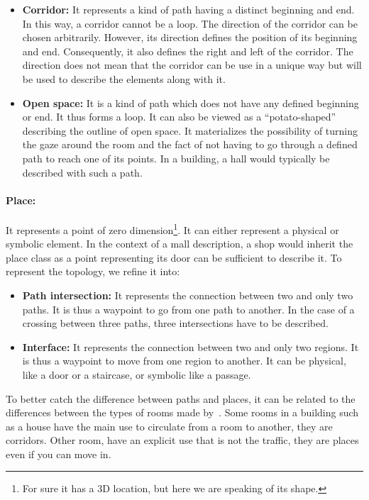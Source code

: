 \begin{itemize}
  \item \textbf{Corridor:} It represents a kind of path having a distinct beginning and end. In this way, a corridor cannot be a loop. The direction of the corridor can be chosen arbitrarily. However, its direction defines the position of its beginning and end. Consequently, it also defines the right and left of the corridor. The direction does not mean that the corridor can be use in a unique way but will be used to describe the elements along with it.
  \item \textbf{Open space:} It is a kind of path which does not have any defined beginning or end. It thus forms a loop. It can also be viewed as a ``potato-shaped'' describing the outline of open space. It materializes the possibility of turning the gaze around the room and the fact of not having to go through a defined path to reach one of its points. In a building, a hall would typically be described with such a path.
\end{itemize}

\paragraph{Place:} It represents a point of zero dimension\footnote{For sure it has a 3D location, but here we are speaking of its shape.}. It can either represent a physical or symbolic element. In the context of a mall description, a shop would inherit the place class as a point representing its door can be sufficient to describe it. To represent the topology, we refine it into:
  
\begin{itemize}
  \item \textbf{Path intersection:} It represents the connection between two and only two paths. It is thus a waypoint to go from one path to another. In the case of a crossing between three paths, three intersections have to be described.
  \item \textbf{Interface:} It represents the connection between two and only two regions. It is thus a waypoint to move from one region to another. It can be physical, like a door or a staircase, or symbolic like a passage.
\end{itemize}

To better catch the difference between paths and places, it can be related to the differences between the types of rooms made by~\cite{andresen_2016_wayfinding}. Some rooms in a building such as a house have the main use to circulate from a room to another, they are corridors. Other room, have an explicit use that is not the traffic, they are places even if you can move in.

